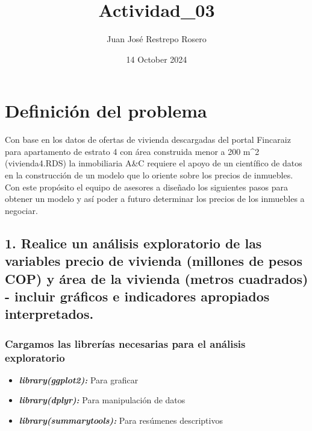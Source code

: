 \documentclass[
]{article}
\title{Actividad\_03}
\author{Juan José Restrepo Rosero}
\date{14 October 2024}
\providecommand{\tightlist}{%
  \setlength{\itemsep}{0pt}\setlength{\parskip}{0pt}}
\begin{document}
\maketitle

{
\setcounter{tocdepth}{2}
\tableofcontents
}
\section{\texorpdfstring{\textbf{Definición del
problema}}{Definición del problema}}\label{definiciuxf3n-del-problema}

Con base en los datos de ofertas de vivienda descargadas del portal
Fincaraiz para apartamento de estrato 4 con área construida menor a 200
m\^{}2 (vivienda4.RDS) la inmobiliaria A\&C requiere el apoyo de un
científico de datos en la construcción de un modelo que lo oriente sobre
los precios de inmuebles. Con este propósito el equipo de asesores a
diseñado los siguientes pasos para obtener un modelo y así poder a
futuro determinar los precios de los inmuebles a negociar.

\subsection{\texorpdfstring{\textbf{1. Realice un análisis exploratorio
de las variables precio de vivienda (millones de pesos COP) y área de la
vivienda (metros cuadrados) - incluir gráficos e indicadores apropiados
interpretados.}}{1. Realice un análisis exploratorio de las variables precio de vivienda (millones de pesos COP) y área de la vivienda (metros cuadrados) - incluir gráficos e indicadores apropiados interpretados.}}\label{realice-un-anuxe1lisis-exploratorio-de-las-variables-precio-de-vivienda-millones-de-pesos-cop-y-uxe1rea-de-la-vivienda-metros-cuadrados---incluir-gruxe1ficos-e-indicadores-apropiados-interpretados.}

\subsubsection{Cargamos las librerías necesarias para el análisis
exploratorio}\label{cargamos-las-libreruxedas-necesarias-para-el-anuxe1lisis-exploratorio}

\begin{itemize}
\tightlist
\item
  \textbf{\emph{library(ggplot2):}} Para graficar
\item
  \textbf{\emph{library(dplyr):}} Para manipulación de datos
\item
  \textbf{\emph{library(summarytools):}} Para resúmenes descriptivos
\end{itemize}
\end{document}
